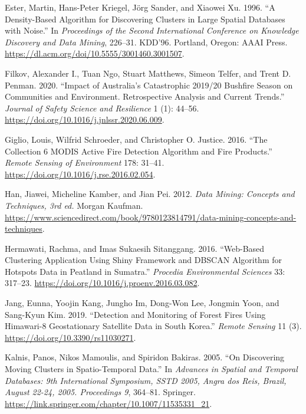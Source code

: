 \begin{CSLReferences}{1}{0}
\leavevmode{}%
Ester, Martin, Hans-Peter Kriegel, Jörg Sander, and Xiaowei Xu. 1996. {``{A Density-Based Algorithm for Discovering Clusters in Large Spatial Databases with Noise}.''} In \emph{{Proceedings of the Second International Conference on Knowledge Discovery and Data Mining}}, 226--31. KDD'96. Portland, Oregon: {AAAI Press}. \url{https://dl.acm.org/doi/10.5555/3001460.3001507}.

\leavevmode{}%
Filkov, Alexander I., Tuan Ngo, Stuart Matthews, Simeon Telfer, and Trent D. Penman. 2020. {``{Impact of Australia's Catastrophic 2019/20 Bushfire Season on Communities and Environment. Retrospective Analysis and Current Trends}.''} \emph{{Journal of Safety Science and Resilience}} 1 (1): 44--56. \url{https://doi.org/10.1016/j.jnlssr.2020.06.009}.

\leavevmode{}%
Giglio, Louis, Wilfrid Schroeder, and Christopher O. Justice. 2016. {``{The Collection 6 MODIS Active Fire Detection Algorithm and Fire Products}.''} \emph{{Remote Sensing of Environment}} 178: 31--41. \url{https://doi.org/10.1016/j.rse.2016.02.054}.

\leavevmode{}%
Han, Jiawei, Micheline Kamber, and Jian Pei. 2012. \emph{{Data Mining: Concepts and Techniques, 3rd ed.}} {Morgan Kaufman}. \url{https://www.sciencedirect.com/book/9780123814791/data-mining-concepts-and-techniques}.

\leavevmode{}%
Hermawati, Rachma, and Imas Sukaesih Sitanggang. 2016. {``{Web-Based Clustering Application Using Shiny Framework and DBSCAN Algorithm for Hotspots Data in Peatland in Sumatra}.''} \emph{{Procedia Environmental Sciences}} 33: 317--23. \url{https://doi.org/10.1016/j.proenv.2016.03.082}.

\leavevmode{}%
Jang, Eunna, Yoojin Kang, Jungho Im, Dong-Won Lee, Jongmin Yoon, and Sang-Kyun Kim. 2019. {``{Detection and Monitoring of Forest Fires Using Himawari-8 Geostationary Satellite Data in South Korea}.''} \emph{{Remote Sensing}} 11 (3). \url{https://doi.org/10.3390/rs11030271}.

\leavevmode{}%
Kalnis, Panos, Nikos Mamoulis, and Spiridon Bakiras. 2005. {``{On Discovering Moving Clusters in Spatio-Temporal Data}.''} In \emph{{Advances in Spatial and Temporal Databases: 9th International Symposium, SSTD 2005, Angra dos Reis, Brazil, August 22-24, 2005. Proceedings 9}}, 364--81. Springer. \url{https://link.springer.com/chapter/10.1007/11535331_21}.


\end{CSLReferences}
